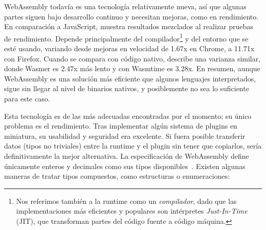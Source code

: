 WebAssembly todavía es una tecnología relativamente nueva, así que algunas
partes siguen bajo desarrollo continuo y necesitan mejoras, como en rendimiento.
En comparación a JavaScript, \textcite{jangda2019not} muestra resultados
mezclados al realizar pruebas de rendimiento. Depende principalmente del
compilador\footnote{Nos referimos también a la runtime como un
\emph{compilador}, dado que las implementaciones más eficientes y populares son
intérpretes \emph{Just-In-Time} (JIT), que transforman partes del código fuente
a código máquina.} y del entorno que se esté usando, variando desde mejoras en
velocidad de 1.67x en Chrome, a 11.71x con Firefox. Cuando se compara con código
nativo, \textcite{libsodiumwasmperf} describe una varianza similar, donde Wasmer
es 2.47x más lento y con Wasmtime es 3.28x. En resumen, aunque WebAssembly es
una solución más eficiente que algunos lenguajes interpretados, sigue sin llegar
al nivel de binarios nativos, y posiblemente no sea lo suficiente para este
caso.

Esta tecnología es de las más adecuadas encontradas por el momento; su único
problema es el rendimiento. Tras implementar algún sistema de plugins en
miniatura, su usabilidad y seguridad era excelente. Si fuera posible transferir
datos (tipos no triviales) entre la runtime y el plugin sin tener que copiarlos,
sería definitivamente la mejor alternativa. La especificación de WebAssembly
define únicamente enteros y decimales como sus tipos
disponibles~\cite{wasmertypes}. Existen algunas maneras de tratar tipos
compuestos, como estructuras o enumeraciones:

